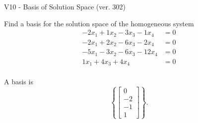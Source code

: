 \begin{exercise}
  \begin{exerciseTitle}V10 - Basis of Solution Space (ver. 302)\end{exerciseTitle}
  \begin{exerciseStatement}
    Find a basis for the solution space of the homogeneous system 
\begin{align*}
 -2 x_ 1 + 1 x_ 2 -3 x_ 3 -1 x_ 4 &= 0  \\ 
  -2 x_ 1 + 2 x_ 2 -6 x_ 3 -2 x_ 4 &= 0  \\ 
  -5 x_ 1 -3 x_ 2 -6 x_ 3 -12 x_ 4 &= 0  \\ 
  1 x_ 1 + 4 x_ 3 + 4 x_ 4 &= 0  \\ 
 \end{align*}


 
  \end{exerciseStatement}

  \begin{exerciseAnswer}
   A basis is   
\[\left\{\left[\begin{array}{c}
0 \\
-2 \\
-1 \\
1
\end{array}\right]\right\}.\]

  


  \end{exerciseAnswer}
\end{exercise}